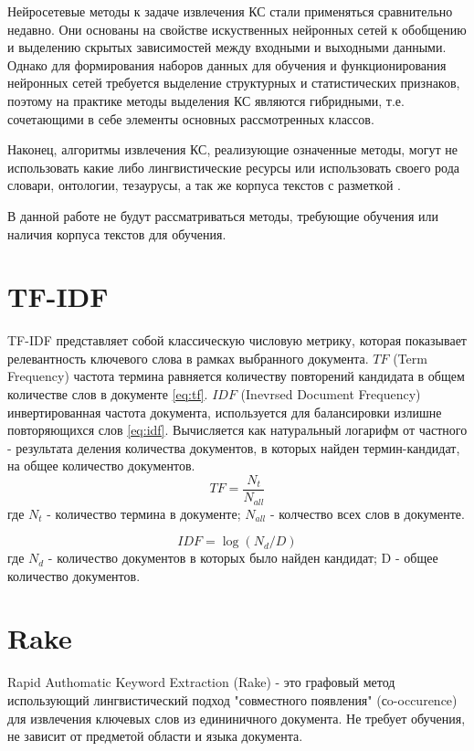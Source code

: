 Нейросетевые методы к задаче извлечения КС стали применяться сравнительно недавно. 
Они основаны на свойстве искуственных нейронных сетей к обобщению и выделению скрытых зависимостей между входными и выходными данными.
Однако для формирования наборов данных для обучения и функционирования нейронных сетей требуется выделение структурных и статистических признаков, поэтому на практике методы выделения КС являются гибридными, т.е. сочетающими в себе элементы основных рассмотренных классов.

Наконец, алгоритмы извлечения КС, реализующие означенные методы, могут не использовать какие либо лингвистические ресурсы или использовать своего рода словари, онтологии, тезаурусы, а так же корпуса текстов с разметкой \cite{20}.

В данной работе не будут рассматриваться методы, требующие обучения или наличия корпуса текстов для обучения.

\section{TF-IDF}
TF-IDF представляет собой классическую числовую метрику, которая показывает релевантность ключевого слова в рамках выбранного документа.
$TF$ (Term Frequency) частота термина равняется количеству повторений кандидата в  общем количестве слов в документе \eqref{eq:tf}.
$IDF$ (Inevrsed Document Frequency) инвертированная частота документа, используется для балансировки излишне повторяющихся слов \eqref{eq:idf}.
Вычисляется как натуральный логарифм от частного - результата деления количества документов, в которых найден термин-кандидат, на общее количество документов.
\begin{equation}
	\label{eq:tf}
	TF = \frac{N_t}{N_{all}}
\end{equation}
где $N_t$ - количество термина в документе; $N_{all}$ - колчество всех слов в документе.

\begin{equation}
	\label{eq:idf}
	IDF = \log(N_d / D)
\end{equation}
где $N_d$ - количество документов в которых было найден кандидат; D - общее количество документов.

\section{Rake}
Rapid Authomatic Keyword Extraction (Rake) - это графовый метод использующий лингвистический подход "совместного появления" (сo-occurence) для извлечения ключевых слов из едининичного документа.
Не требует обучения, не зависит от предметой области и языка документа.

